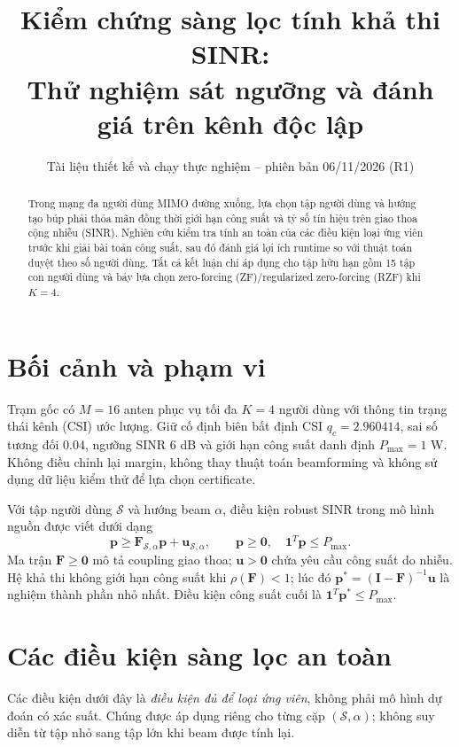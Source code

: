 \documentclass[11pt,onecolumn]{IEEEtran}
\title{Kiểm chứng sàng lọc tính khả thi SINR:\\ Thử nghiệm sát ngưỡng và đánh giá trên kênh độc lập}
\author{Tài liệu thiết kế và chạy thực nghiệm -- phiên bản 06/11/2026 (R1)}
\date{}
\begin{document}
\maketitle
\begin{abstract}
Trong mạng đa người dùng MIMO đường xuống, lựa chọn tập người dùng và hướng tạo búp phải thỏa mãn đồng thời giới hạn công suất và tỷ số tín hiệu trên giao thoa cộng nhiễu (SINR). Nghiên cứu kiểm tra tính an toàn của các điều kiện loại ứng viên trước khi giải bài toán công suất, sau đó đánh giá lợi ích runtime so với thuật toán duyệt theo số người dùng. Tất cả kết luận chỉ áp dụng cho tập hữu hạn gồm 15 tập con người dùng và bảy lựa chọn zero-forcing (ZF)/regularized zero-forcing (RZF) khi $K=4$.
\end{abstract}

\section{Bối cảnh và phạm vi}
Trạm gốc có $M=16$ anten phục vụ tối đa $K=4$ người dùng với thông tin trạng thái kênh (CSI) ước lượng. Giữ cố định biên bất định CSI $q_c=2.960414$, sai số tương đối $0.04$, ngưỡng SINR $6$ dB và giới hạn công suất danh định $P_{\max}=1$ W. Không điều chỉnh lại margin, không thay thuật toán beamforming và không sử dụng dữ liệu kiểm thử để lựa chọn certificate.

Với tập người dùng $\mathcal S$ và hướng beam $\alpha$, điều kiện robust SINR trong mô hình nguồn được viết dưới dạng
\begin{equation}
\mathbf p\geq\mathbf F_{\mathcal S,\alpha}\mathbf p+\mathbf u_{\mathcal S,\alpha},\qquad
\mathbf p\geq\mathbf 0,\quad \mathbf 1^T\mathbf p\leq P_{\max}.
\label{eq:power}
\end{equation}
Ma trận $\mathbf F\geq\mathbf 0$ mô tả coupling giao thoa; $\mathbf u>\mathbf0$ chứa yêu cầu công suất do nhiễu. Hệ khả thi không giới hạn công suất khi $\rho(\mathbf F)<1$; lúc đó $\mathbf p^*=(\mathbf I-\mathbf F)^{-1}\mathbf u$ là nghiệm thành phần nhỏ nhất. Điều kiện công suất cuối là $\mathbf1^T\mathbf p^*\leq P_{\max}$.

\section{Các điều kiện sàng lọc an toàn}
Các điều kiện dưới đây là \emph{điều kiện đủ để loại ứng viên}, không phải mô hình dự đoán có xác suất. Chúng được áp dụng riêng cho từng cặp $(\mathcal S,\alpha)$; không suy diễn từ tập nhỏ sang tập lớn khi beam được tính lại.
\end{document}
